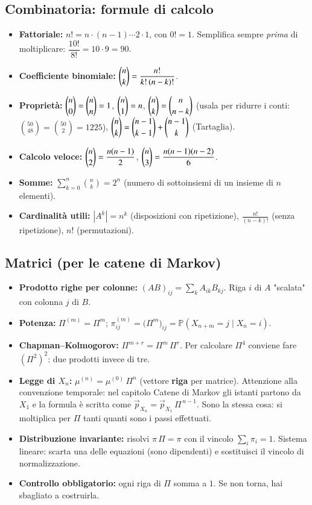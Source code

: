 \documentclass[12pt]{extarticle} %
\begin{document}
\subsection{Combinatoria: formule di calcolo}
\begin{itemize}
    \item \textbf{Fattoriale:} $n! = n\cdot(n-1)\cdots 2\cdot 1$, con $0! = 1$. Semplifica sempre \emph{prima} di moltiplicare: $\dfrac{10!}{8!} = 10\cdot 9 = 90$.
    \item \textbf{Coefficiente binomiale:} $\dbinom{n}{k} = \dfrac{n!}{k!\,(n-k)!}$.
    \item \textbf{Proprietà:} $\dbinom{n}{0}=\dbinom{n}{n}=1$, \quad $\dbinom{n}{1}=n$, \quad $\dbinom{n}{k}=\dbinom{n}{n-k}$ {\footnotesize (usala per ridurre i conti: $\binom{50}{48}=\binom{50}{2}=1225$)}, \quad $\dbinom{n}{k}=\dbinom{n-1}{k-1}+\dbinom{n-1}{k}$ (Tartaglia).
    \item \textbf{Calcolo veloce:} $\dbinom{n}{2} = \dfrac{n(n-1)}{2}$, \quad $\dbinom{n}{3} = \dfrac{n(n-1)(n-2)}{6}$.
    \item \textbf{Somme:} $\displaystyle\sum_{k=0}^{n}\binom{n}{k} = 2^n$ \; (numero di sottoinsiemi di un insieme di $n$ elementi).
    \item \textbf{Cardinalità utili:} $|A^{k}| = n^k$ (disposizioni con ripetizione), \; $\frac{n!}{(n-k)!}$ (senza ripetizione), \; $n!$ (permutazioni).
\end{itemize}

\subsection{Matrici (per le catene di Markov)}
\begin{itemize}
    \item \textbf{Prodotto righe per colonne:} $(AB)_{ij} = \sum_{k} A_{ik}B_{kj}$. {\footnotesize Riga $i$ di $A$ "scalata" con colonna $j$ di $B$.}
    \item \textbf{Potenza:} $\Pi^{(m)} = \Pi^m$; \; $\pi^{(m)}_{ij} = \big(\Pi^m\big)_{ij} = \mathbb{P}(X_{n+m}=j \mid X_n = i)$.
    \item \textbf{Chapman--Kolmogorov:} $\Pi^{m+r} = \Pi^{m}\,\Pi^{r}$. {\footnotesize Per calcolare $\Pi^4$ conviene fare $(\Pi^2)^2$: due prodotti invece di tre.}
    \item \textbf{Legge di $X_n$:} $\mu^{(n)} = \mu^{(0)}\,\Pi^{n}$ \; (vettore \textbf{riga} per matrice). {\footnotesize Attenzione alla convenzione temporale: nel capitolo Catene di Markov gli istanti partono da $X_1$ e la formula è scritta come $\vec p_{X_n} = \vec p_{X_1}\,\Pi^{\,n-1}$. Sono la stessa cosa: si moltiplica per $\Pi$ tanti quanti sono i passi effettuati.}
    \item \textbf{Distribuzione invariante:} risolvi $\pi\,\Pi = \pi$ con il vincolo $\sum_i \pi_i = 1$. {\footnotesize Sistema lineare: scarta una delle equazioni (sono dipendenti) e sostituisci il vincolo di normalizzazione.}
    \item \textbf{Controllo obbligatorio:} ogni riga di $\Pi$ somma a $1$. Se non torna, hai sbagliato a costruirla.
\end{itemize}
\end{document}
